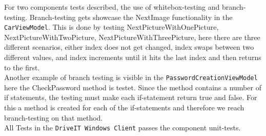 For two components tests described, the use of whitebox-testing and branch-testing. Branch-testing gets showcase the NextImage functionality in the \texttt{CarViewModel}. This is done by testing NextPictureWithOnePicture, NextPictureWithTwoPicture, NextPictureWithThreePicture, here there are three different scenarios, either index does not get changed, index swaps between two different values, and index increments until it hits the last index and then returns to the first. \\
Another example of branch testing is visible in the \texttt{PasswordCreationViewModel} here the CheckPassword method is testet. Since the method contains a number of if statements, the testing must make each if-statement return true and false. For this a method is created for each of the if-statements and therefore we reach branch-testing on that method.\\

All Tests in the \texttt{DriveIT Windows Client} passes the component unit-tests.